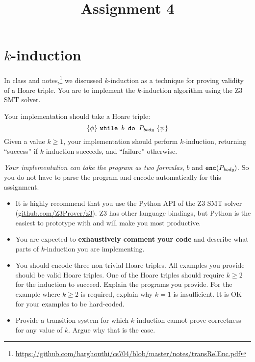 \documentclass[11pt, oneside]{article}   	%
\title{Assignment 4}
\begin{document}
\maketitle

\section*{$k$-induction}
In class and notes,\footnote{\url{https://github.com/barghouthi/cs704/blob/master/notes/transRelEnc.pdf}}
 we discussed $k$-induction as a technique
for proving validity of a Hoare triple.
You are to implement the $k$-induction algorithm
using the Z3 SMT solver.


Your implementation should take a Hoare triple:
$$\{\phi\}\ \texttt{while } b \texttt{ do } P_\emph{body}\  \{\psi\}$$
Given a value $k \geq 1$,
your implementation should perform
$k$-induction, returning ``success'' if
$k$-induction succeeds, and ``failure'' otherwise.

\emph{Your implementation can take the program
as two formulas}, $b$ and $\texttt{enc}(P_{\emph{body}})$.
So you do not have to parse the program and encode automatically
for this assignment.

\begin{itemize}
  \item It is highly recommend that you use the Python
  API of the Z3 SMT solver (\url{github.com/Z3Prover/z3}).
  Z3 has other language bindings, but Python is the easiest
  to prototype with and will make you most productive.

\item You are expected to \textbf{exhaustively comment your
code} and describe what parts of $k$-induction you are implementing.

\item You should encode three non-trivial Hoare triples.
All examples you provide should be valid Hoare triples.
One of the Hoare triples should require $k\geq2$
for the induction to succeed.
Explain the programs you provide.
For the example where $k\geq 2$ is required, explain why
$k=1$ is insufficient.
It is OK for your examples to be hard-coded.

\item Provide a transition system
for which $k$-induction cannot prove correctness
for any value of $k$. Argue why that is the case.
\end{itemize}
\end{document}
